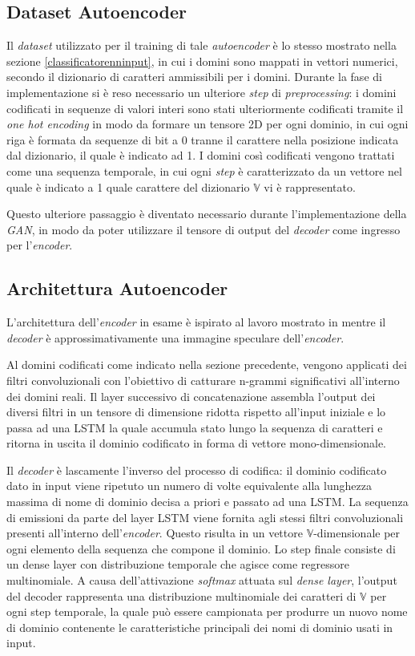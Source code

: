 \subsection{Dataset Autoencoder}
\label{datasetautoencoder}
Il \textit{dataset} utilizzato per il training di tale \textit{autoencoder} è lo stesso mostrato nella sezione \ref{classificatorenninput}, in cui i domini sono mappati in vettori numerici, secondo il dizionario di caratteri ammissibili per i domini. Durante la fase di implementazione si è reso necessario un ulteriore \textit{step} di \textit{preprocessing}: i domini codificati in sequenze di valori interi sono stati ulteriormente codificati tramite il \textit{one hot encoding} \cite{onehot} in modo da formare un tensore 2D per ogni dominio, in cui ogni riga è formata da sequenze di bit a 0 tranne il carattere nella posizione indicata dal dizionario, il quale è indicato ad 1. I domini così codificati vengono trattati come una sequenza temporale, in cui ogni \textit{step} è caratterizzato da un vettore nel quale è indicato a 1 quale carattere del dizionario $\mathbb{V}$ vi è rappresentato. 

Questo ulteriore passaggio è diventato necessario durante l'implementazione della \textit{GAN}, in modo da poter utilizzare il tensore di output del \textit{decoder} come ingresso per l'\textit{encoder}.


\subsection{Architettura Autoencoder}
\label{archautoencoder}
L'architettura dell'\textit{encoder} in esame è ispirato al lavoro mostrato in \cite{1508.06615} mentre il \textit{decoder} è approssimativamente una immagine speculare dell'\textit{encoder}.

Al domini codificati come indicato nella sezione precedente, vengono applicati dei filtri convoluzionali con l'obiettivo di catturare n-grammi significativi all'interno dei domini reali. Il layer successivo di concatenazione assembla l'output dei diversi filtri in un tensore di dimensione ridotta rispetto all'input iniziale e lo passa ad una LSTM la quale accumula stato lungo la sequenza di caratteri e ritorna in uscita il dominio codificato in forma di vettore mono-dimensionale.

Il \textit{decoder} è lascamente l'inverso del processo di codifica: il dominio codificato dato in input viene ripetuto un numero di volte equivalente alla lunghezza massima di nome di dominio decisa a priori e passato ad una LSTM. La sequenza di emissioni da parte del layer LSTM viene fornita agli stessi filtri convoluzionali presenti all'interno dell'\textit{encoder}. Questo risulta in un vettore $\mathbb{V}$-dimensionale per ogni elemento della sequenza che compone il dominio.
Lo step finale consiste di un dense layer con distribuzione temporale che agisce come regressore multinomiale. A causa dell'attivazione \textit{softmax} attuata sul \textit{dense layer}, l'output del decoder rappresenta una distribuzione multinomiale dei caratteri di $\mathbb{V}$ per ogni step temporale, la quale può essere campionata per produrre un nuovo nome di dominio contenente le caratteristiche principali dei nomi di dominio usati in input.

